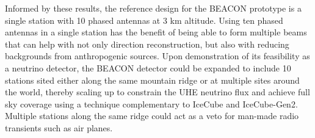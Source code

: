 \documentclass[12pt]{article}
\begin{document}
Informed by these results, the reference design for the BEACON prototype is a single station with 10 phased antennas at 3 km altitude. Using ten phased antennas in a single station has the benefit of being able to form multiple beams that can help with not only direction reconstruction, but also with reducing backgrounds from anthropogenic sources. Upon demonstration of its feasibility as a neutrino detector, the BEACON detector could be expanded to include 10 stations sited either along the same mountain ridge or at multiple sites around the world, thereby scaling up to constrain the UHE neutrino flux and achieve full sky coverage using a technique complementary to IceCube and IceCube-Gen2. Multiple stations along the same ridge could act as a veto for man-made radio transients such as air planes. 
\end{document}
